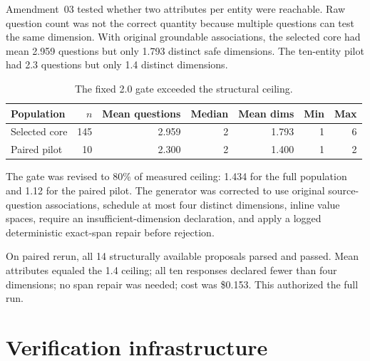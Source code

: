 \documentclass[11pt]{article}
\begin{document}
Amendment~03 tested whether two attributes per entity were reachable. Raw
question count was not the correct quantity because multiple questions can test
the same dimension. With original groundable associations, the selected core
had mean 2.959 questions but only 1.793 distinct safe dimensions. The ten-entity
pilot had 2.3 questions but only 1.4 distinct dimensions.

\begin{table}[h]
\centering
\begin{tabular}{lrrrrrr}
\toprule
Population & $n$ & Mean questions & Median & Mean dims & Min & Max \\
\midrule
Selected core & 145 & 2.959 & 2 & 1.793 & 1 & 6 \\
Paired pilot & 10 & 2.300 & 2 & 1.400 & 1 & 2 \\
\bottomrule
\end{tabular}
\caption{The fixed 2.0 gate exceeded the structural ceiling.}
\end{table}

The gate was revised to 80\% of measured ceiling: 1.434 for the full population
and 1.12 for the paired pilot. The generator was corrected to use original
source-question associations, schedule at most four distinct dimensions, inline
value spaces, require an insufficient-dimension declaration, and apply a logged
deterministic exact-span repair before rejection.

On paired rerun, all 14 structurally available proposals parsed and passed.
Mean attributes equaled the 1.4 ceiling; all ten responses declared fewer than
four dimensions; no span repair was needed; cost was \$0.153. This authorized
the full run.

\section{Verification infrastructure}
\end{document}
